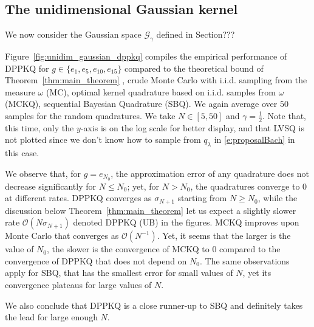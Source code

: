 \documentclass[twoside,11pt]{book}
\numberwithin{theorem}{chapter}
\numberwithin{definition}{chapter}
\numberwithin{proposition}{chapter}
\numberwithin{corollary}{chapter}
\numberwithin{example}{chapter}
\numberwithin{lemma}{chapter}
\numberwithin{assumption}{chapter}
\numberwithin{equation}{chapter}
\numberwithin{figure}{chapter}
\newcommand{\rb}[1]{\textcolor{magenta}{#1}}
\begin{document}
\subsection{The unidimensional Gaussian kernel}\label{s:gaussian_numsim}
We now consider the Gaussian space $\mathcal{G}_{\gamma}$ defined in Section??? 

Figure~\ref{fig:unidim_gaussian_dppkq} compiles the empirical performance of DPPKQ for $g \in \{e_{1},e_{5},e_{10},e_{15}\}$ compared to the theoretical bound of Theorem~\ref{thm:main_theorem} , crude Monte Carlo with i.i.d. sampling from the measure $\omega$ (MC), optimal kernel quadrature based on i.i.d. samples from $\omega$ (MCKQ), sequential Bayesian Quadrature (SBQ). We again average over $50$ samples for the random quadratures.
We take $N \in [5,50]$ and $\gamma = \frac{1}{2}$. Note that, this time, only the $y$-axis is on the log scale for better display, and that LVSQ is not plotted since we don't know how to sample from $q_\lambda$ in \eqref{e:proposalBach} in this case.
%

We observe that, for $g = e_{N_{0}}$, the approximation error of any quadrature does not decrease significantly for $N \leq N_{0}$; yet, for $N > N_{0}$, the quadratures converge to $0$ at different rates. DPPKQ converges as $\sigma_{N+1}$ starting from $N\geq N_{0}$, while the discussion below Theorem~\ref{thm:main_theorem} let us expect a slightly slower rate $\mathcal{O}(N\sigma_{N+1})$ denoted DPPKQ (UB) in the figures. MCKQ improves upon Monte Carlo that converges as $\mathcal{O}(N^{-1})$. Yet, it seems that the larger is the value of $N_0$, the slower is the convergence of MCKQ to $0$ compared to the convergence of DPPKQ that does not depend on $N_0$.
 The same observations apply for SBQ, that has the smallest error for small values of $N$, yet its convergence plateaus for large values of $N$.

We also conclude that DPPKQ is a close runner-up to SBQ and definitely takes the lead for large enough $N$.
\end{document}
